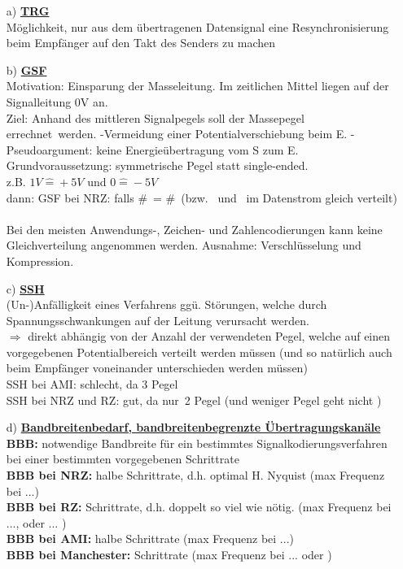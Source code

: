 \documentclass[10pt,a4paper]{scrartcl}
\begin{document}
\begin{enumerate}
	\item[a)] \textbf{\underline{\ac{TRG}}}\\[0.5em]
	Möglichkeit, nur aus dem übertragenen Datensignal eine Resynchronisierung beim Empfänger auf den Takt des Senders zu machen
	
	\item[b)]\textbf{\underline{ \ac{GSF}}} \\[0.5em]
	Motivation: Einsparung der Masseleitung. Im zeitlichen Mittel liegen auf der Signalleitung 0V an.\\
	Ziel: Anhand des mittleren Signalpegels soll der Massepegel \glqq errechnet\grqq\ werden.
	\subitem -Vermeidung einer Potentialverschiebung beim E.
	\subitem -Pseudoargument: keine Energieübertragung vom S zum E.\\
	Grundvoraussetzung: symmetrische Pegel statt single-ended. \\
	z.B. $1V \hat{=} +5V$ und $0 \hat{=} -5V$\\
	dann: \ac{GSF} bei \ac{NRZ}: falls \#\grqq\ = \#\grqq\ (bzw. \grqq\ und \grqq\ im Datenstrom gleich verteilt)\\\\
	Bei den meisten Anwendungs-, Zeichen- und Zahlencodierungen kann keine Gleichverteilung angenommen werden. Ausnahme: Verschlüsselung und Kompression.
	\item[c)] \textbf{\underline{\ac{SSH}}}\\[0.5em]
	(Un-)Anfälligkeit eines Verfahrens ggü. Störungen, welche durch Spannungsschwankungen auf der Leitung verursacht werden.\\
	$\Rightarrow$ direkt abhängig von der Anzahl der verwendeten Pegel, welche auf einen vorgegebenen Potentialbereich verteilt werden müssen (und so natürlich auch beim Empfänger voneinander unterschieden werden müssen)\\
	\ac{SSH} bei \ac{AMI}: schlecht, da 3 Pegel\\
	\ac{SSH} bei \ac{NRZ} und \ac{RZ}: gut, da \glqq nur\grqq\ 2 Pegel (und weniger Pegel geht nicht \smiley{})
	
	\item[d)] \textbf{\underline{Bandbreitenbedarf, bandbreitenbegrenzte Übertragungskanäle}}\\[0.5em]
	\noindent
	\textbf{\ac{BBB}: }notwendige Bandbreite für ein bestimmtes Signalkodierungsverfahren bei einer bestimmten vorgegebenen Schrittrate\\
	\textbf{\ac{BBB} bei \acl{NRZ}:} halbe Schrittrate, d.h. optimal H. Nyquist (max Frequenz bei ...\grqq)\\
	\textbf{\ac{BBB} bei \acl{RZ}:} Schrittrate, d.h. doppelt so viel wie nötig. (max Frequenz bei ...\grqq, oder ...\grqq{} )\\
	\textbf{\ac{BBB} bei \acl{AMI}:} halbe Schrittrate (max Frequenz bei ...\grqq)\\
	\textbf{\ac{BBB} bei Manchester:} Schrittrate (max Frequenz bei ...\grqq{} oder \grqq)\\
\end{enumerate}
\end{document}
